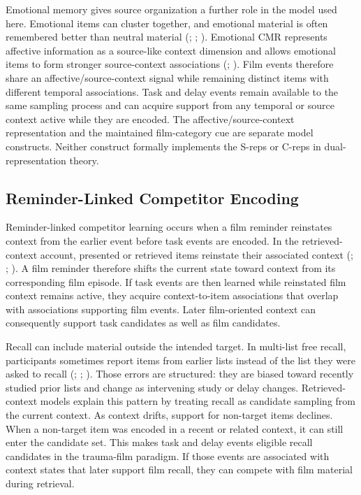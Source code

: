 \documentclass[
  man,
  floatsintext,
  longtable,
  nolmodern,
  notxfonts,
  notimes,
  draftfirst,
  colorlinks=true,linkcolor=blue,citecolor=blue,urlcolor=blue]{apa7}
\begin{document}
Emotional memory gives source organization a further role in the model
used here. Emotional items can cluster together, and emotional material
is often remembered better than neutral material
(;
;
). Emotional
CMR represents affective information as a source-like context dimension
and allows emotional items to form stronger source-context associations
(;
). Film events
therefore share an affective/source-context signal while remaining
distinct items with different temporal associations. Task and delay
events remain available to the same sampling process and can acquire
support from any temporal or source context active while they are
encoded. The affective/source-context representation and the maintained
film-category cue are separate model constructs. Neither construct
formally implements the S-reps or C-reps in dual-representation theory.

\subsection{Reminder-Linked Competitor
Encoding}\label{reminder-linked-competitor-encoding}

Reminder-linked competitor learning occurs when a film reminder
reinstates context from the earlier event before task events are
encoded. In the retrieved-context account, presented or retrieved items
reinstate their associated context
(;
;
). A film
reminder therefore shifts the current state toward context from its
corresponding film episode. If task events are then learned while
reinstated film context remains active, they acquire context-to-item
associations that overlap with associations supporting film events.
Later film-oriented context can consequently support task candidates as
well as film candidates.

Recall can include material outside the intended target. In multi-list
free recall, participants sometimes report items from earlier lists
instead of the list they were asked to recall
(;
;
). Those errors
are structured: they are biased toward recently studied prior lists and
change as intervening study or delay changes. Retrieved-context models
explain this pattern by treating recall as candidate sampling from the
current context. As context drifts, support for non-target items
declines. When a non-target item was encoded in a recent or related
context, it can still enter the candidate set. This makes task and delay
events eligible recall candidates in the trauma-film paradigm. If those
events are associated with context states that later support film
recall, they can compete with film material during retrieval.
\end{document}
